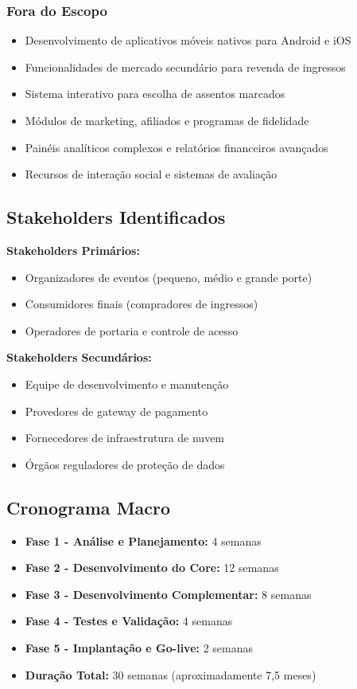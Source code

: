 \subsubsection{Fora do Escopo}
\begin{itemize}
    \item Desenvolvimento de aplicativos móveis nativos para Android e iOS
    \item Funcionalidades de mercado secundário para revenda de ingressos
    \item Sistema interativo para escolha de assentos marcados
    \item Módulos de marketing, afiliados e programas de fidelidade
    \item Painéis analíticos complexos e relatórios financeiros avançados
    \item Recursos de interação social e sistemas de avaliação
\end{itemize}

\subsection{Stakeholders Identificados}

\textbf{Stakeholders Primários:}
\begin{itemize}
    \item Organizadores de eventos (pequeno, médio e grande porte)
    \item Consumidores finais (compradores de ingressos)
    \item Operadores de portaria e controle de acesso
\end{itemize}

\textbf{Stakeholders Secundários:}
\begin{itemize}
    \item Equipe de desenvolvimento e manutenção
    \item Provedores de gateway de pagamento
    \item Fornecedores de infraestrutura de nuvem
    \item Órgãos reguladores de proteção de dados
\end{itemize}

\subsection{Cronograma Macro}

\begin{itemize}
    \item \textbf{Fase 1 - Análise e Planejamento:} 4 semanas
    \item \textbf{Fase 2 - Desenvolvimento do Core:} 12 semanas
    \item \textbf{Fase 3 - Desenvolvimento Complementar:} 8 semanas
    \item \textbf{Fase 4 - Testes e Validação:} 4 semanas
    \item \textbf{Fase 5 - Implantação e Go-live:} 2 semanas
    \item \textbf{Duração Total:} 30 semanas (aproximadamente 7,5 meses)
\end{itemize}

